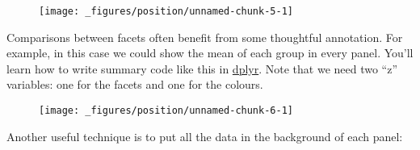 \begin{figure}[H]
  \texttt{[image: \_figures/position/unnamed-chunk-5-1]}
\end{figure}

Comparisons between facets often benefit from some thoughtful
annotation. For example, in this case we could show the mean of each
group in every panel. You'll learn how to write summary code like this
in \protect\hyperlink{cha:dplyr}{dplyr}. Note that we need two ``z''
variables: one for the facets and one for the colours.

\begin{Shaded}
\end{Shaded}

\begin{figure}[H]
  \texttt{[image: \_figures/position/unnamed-chunk-6-1]}
\end{figure}

Another useful technique is to put all the data in the background of
each panel:

\begin{Shaded}
\begin{Highlighting}[]
\StringTok{ }

\StringTok{ }
\StringTok{  }\NormalTok{(}  \NormalTok{) +}
\StringTok{  }\NormalTok{(}\NormalTok{(} \StringTok{ }
\StringTok{  }
\end{Highlighting}
\end{Shaded}

